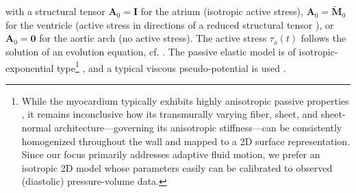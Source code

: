with a structural tensor $\boldsymbol{A}_{0}=\boldsymbol{I}$ for the atrium (isotropic active stress), $\boldsymbol{A}_{0}=\tilde{\boldsymbol{M}}_{0}$ for the ventricle (active stress in directions of a reduced structural tensor \cite{hirschvogel2024-frsi}), or $\boldsymbol{A}_{0}=\boldsymbol{0}$ for the aortic arch (no active stress). The active stress $\tau_{\mathrm{a}}(t)$ follows the solution of an evolution equation, cf. \cite{hirschvogel2017}. The passive elastic model is of isotropic-exponential type\footnote{While the myocardium typically exhibits highly anisotropic passive properties \cite{holzapfel2009}, it remains inconclusive how its transmurally varying fiber, sheet, and sheet-normal architecture---governing its anisotropic stiffness---can be consistently homogenized throughout the wall and mapped to a 2D surface representation. Since our focus primarily addresses adaptive fluid motion, we prefer an isotropic 2D model whose parameters easily can be calibrated to observed (diastolic) pressure-volume data.} \cite{demiray1972}, and a typical viscous pseudo-potential is used \cite{chapelle2012}.\\

